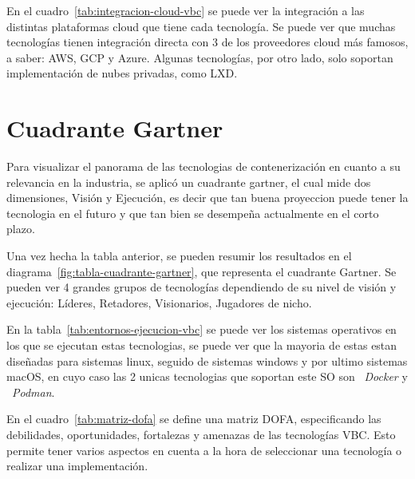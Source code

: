 En el cuadro~\ref{tab:integracion-cloud-vbc} se puede ver la integración a las distintas plataformas cloud que tiene cada tecnología. Se puede ver que muchas tecnologías tienen integración directa con 3 de los proveedores cloud más famosos, a saber: AWS, GCP y Azure. Algunas tecnologías, por otro lado, solo soportan implementación de nubes privadas, como LXD.


\section{Cuadrante Gartner}
Para visualizar el panorama de las tecnologias de contenerización en cuanto a su relevancia en la industria, se aplicó un cuadrante gartner, el cual mide dos dimensiones, Visión y Ejecución, es decir que tan buena proyeccion puede tener la tecnologia en el futuro y que tan bien se desempeña actualmente en el corto plazo.



Una vez hecha la tabla anterior, se pueden resumir los resultados en el diagrama~\ref{fig:tabla-cuadrante-gartner}, que representa el cuadrante Gartner. Se pueden ver 4 grandes grupos de tecnologías dependiendo de su nivel de visión y ejecución: Líderes, Retadores, Visionarios, Jugadores de nicho.


En la tabla~\ref{tab:entornos-ejecucion-vbc} se puede ver los sistemas operativos en los que se ejecutan estas tecnologias, se puede ver que la mayoria de estas estan diseñadas para sistemas linux, seguido de sistemas windows y por ultimo sistemas macOS, en cuyo caso las 2 unicas tecnologias que soportan este SO son ~\textit{Docker} y ~\textit{Podman}.


En el cuadro~\ref{tab:matriz-dofa} se define una matriz DOFA, especificando las debilidades, oportunidades, fortalezas y amenazas de las tecnologías VBC. Esto permite tener varios aspectos en cuenta a la hora de seleccionar una tecnología o realizar una implementación.

